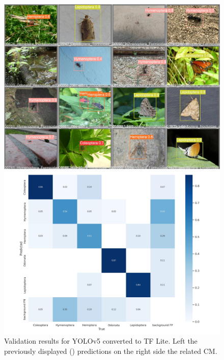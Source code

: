 \begin{figure}
    \centering
    \begin{multicols}{2}
        \begin{minipage}{.45\textwidth}
            \includegraphics[width=\textwidth]{images/val_batch2_pred.png}
        \end{minipage}
        \columnbreak
        \begin{minipage}{.45\textwidth}
            \includegraphics[width=\textwidth]{images/yolo-confusion_matrix.png}
        \end{minipage}
    \end{multicols}
    \caption{Validation results for YOLOv5 converted to TF Lite. Left the previously displayed () predictions on the right side the related CM.}
    \label{fig:yolo-validation-results}
\end{figure}

